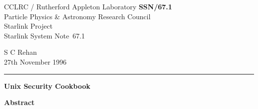 \documentclass[11pt]{article}
\newcommand{\stardoccategory}  {Starlink System Note}
\newcommand{\stardocinitials}  {SSN}
\newcommand{\stardocnumber}    {67.1}
\newcommand{\stardocauthors}   {S C Rehan}
\newcommand{\stardocdate}      {27th November 1996}
\newcommand{\stardoctitle}     {Unix Security Cookbook}
\newcommand{\stardocname}{\stardocinitials /\stardocnumber}
\newenvironment{latexonly}{}{}
\begin{document}
\thispagestyle{empty}

\begin{latexonly}
   CCLRC / {\sc Rutherford Appleton Laboratory} \hfill {\bf \stardocname}\\
   {\large Particle Physics \& Astronomy Research Council}\\
   {\large Starlink Project\\}
   {\large \stardoccategory\ \stardocnumber}
   \begin{flushright}
   \stardocauthors\\
   \stardocdate
   \end{flushright}
   \vspace{-4mm}
   \rule{\textwidth}{0.5mm}
   \vspace{5mm}
   \begin{center}
   {\Huge\bf \stardoctitle}
   \end{center}
   \vspace{5mm}

   \vspace{10mm}
   \begin{center}
      {\Large\bf Abstract}
   \end{center}
\end{latexonly}
\end{document}
